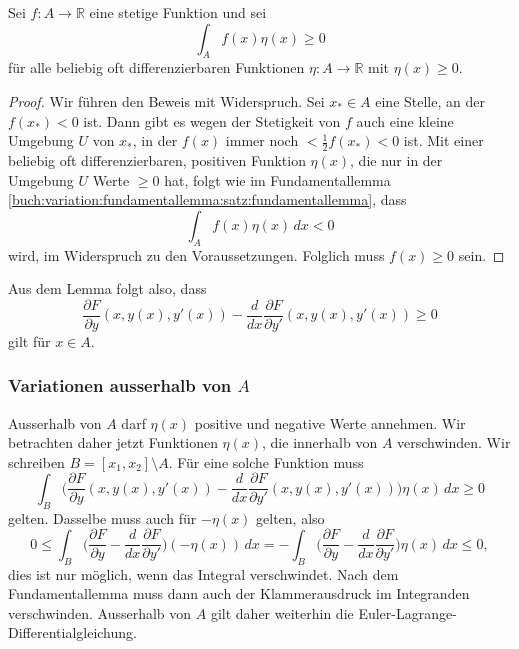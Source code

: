 \begin{satz}
Sei $f\colon A\to\mathbb{R}$ eine stetige Funktion und sei
\[
\int_A f(x)\eta(x)\ge 0
\]
für alle beliebig oft differenzierbaren Funktionen $\eta\colon A\to\mathbb{R}$
mit $\eta(x)\ge 0$.
\end{satz}

\begin{proof}
Wir führen den Beweis mit Widerspruch.
Sei $x_*\in A$ eine Stelle, an der $f(x_*)<0$ ist.
Dann gibt es wegen der Stetigkeit von $f$ auch eine kleine Umgebung $U$ von
$x_*$, in der $f(x)$ immer noch $<\frac12f(x_*)<0$ ist.
Mit einer beliebig oft differenzierbaren, positiven Funktion $\eta(x)$,
die nur in der Umgebung $U$ Werte $\ge 0$ hat, folgt wie im
Fundamentallemma \ref{buch:variation:fundamentallemma:satz:fundamentallemma},
dass
\[
\int_A f(x)\eta(x)\,dx < 0
\]
wird, im Widerspruch zu den Voraussetzungen.
Folglich muss $f(x)\ge 0$ sein.
\end{proof}

Aus dem Lemma folgt also, dass
\begin{equation}
\frac{\partial F}{\partial y}(x,y(x),y'(x))
-
\frac{d}{dx}
\frac{\partial F}{\partial y'}(x,y(x),y'(x))
\ge 0
\end{equation}
gilt für $x\in A$.

%
%
\subsubsection{Variationen ausserhalb von $A$}
Ausserhalb von $A$ darf $\eta(x)$ positive und negative Werte annehmen.
Wir betrachten daher jetzt Funktionen $\eta(x)$, die innerhalb von $A$
verschwinden.
Wir schreiben $B=[x_1,x_2]\setminus A$.
Für eine solche Funktion muss
\[
\int_B \biggl(
\frac{\partial F}{\partial y}(x,y(x),y'(x))
-
\frac{d}{dx}
\frac{\partial F}{\partial y'}(x,y(x),y'(x))
\biggr)
\eta(x)
\,dx
\ge 0
\]
gelten.
Dasselbe muss auch für $-\eta(x)$ gelten, also
\[
0
\le
\int_B \biggl(
\frac{\partial F}{\partial y}
-
\frac{d}{dx}
\frac{\partial F}{\partial y'}
\biggr)
(-\eta(x))
\,dx
=
-
\int_B \biggl(
\frac{\partial F}{\partial y}
-
\frac{d}{dx}
\frac{\partial F}{\partial y'}
\biggr)
\eta(x)
\,dx
\le 0,
\]
dies ist nur möglich, wenn das Integral verschwindet.
Nach dem Fundamentallemma muss dann auch der Klammerausdruck
im Integranden verschwinden.
Ausserhalb von $A$ gilt daher weiterhin die
Euler-Lagrange-Differentialgleichung.


